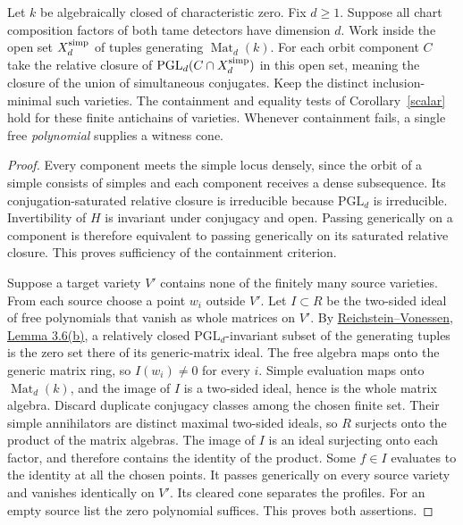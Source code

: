 \documentclass[11pt]{article}
\begin{document}
\begin{cor}\label{pure}
Let $k$ be algebraically closed of characteristic zero. Fix $d\ge1$.
Suppose all chart composition factors of both tame detectors have
dimension $d$. Work inside the open set $X_d^{\rm simp}$ of tuples
generating $\operatorname{Mat}_d(k)$. For each orbit component $C$
take the relative closure of
$\mathrm{PGL}_d(C\cap X_d^{\rm simp})$ in this open set, meaning the
closure of the union of simultaneous conjugates. Keep the distinct
inclusion-minimal such varieties. The containment and equality tests of
Corollary~\ref{scalar} hold for these finite antichains of varieties.
Whenever containment fails, a single free \emph{polynomial} supplies a
witness cone.
\end{cor}
\begin{proof}
Every component meets the simple locus densely, since the orbit
of a simple consists of simples and each component receives a dense
subsequence. Its conjugation-saturated relative closure is irreducible
because $\mathrm{PGL}_d$ is irreducible. Invertibility of $H$ is invariant
under conjugacy and open. Passing generically on a component is
therefore equivalent to passing generically on its saturated relative
closure. This proves sufficiency of the containment criterion.

Suppose a target variety $V'$ contains none of the finitely many
source varieties. From each source choose a point $w_i$ outside $V'$.
Let $I\subset R$ be the two-sided ideal of free polynomials that
vanish as whole matrices on $V'$. By
\href{https://arxiv.org/abs/math/0407152}{Reichstein--Vonessen,
Lemma 3.6(b)}, a relatively closed $\mathrm{PGL}_d$-invariant subset
of the generating tuples is the zero set there of its generic-matrix
ideal. The free algebra maps onto the generic matrix ring, so
$I(w_i)\ne0$ for every $i$. Simple evaluation maps onto
$\operatorname{Mat}_d(k)$, and the image of $I$ is a two-sided ideal,
hence is the whole matrix algebra. Discard duplicate conjugacy
classes among the chosen finite set. Their simple annihilators are
distinct maximal two-sided ideals, so $R$ surjects onto the product
of the matrix algebras. The image of $I$ is an ideal surjecting onto
each factor, and therefore contains the identity of the product.
Some $f\in I$ evaluates to the identity at all the chosen points.
It passes generically on every source variety and vanishes identically
on $V'$. Its cleared cone separates the profiles. For an empty source
list the zero polynomial suffices. This proves both assertions.
\end{proof}
\end{document}
